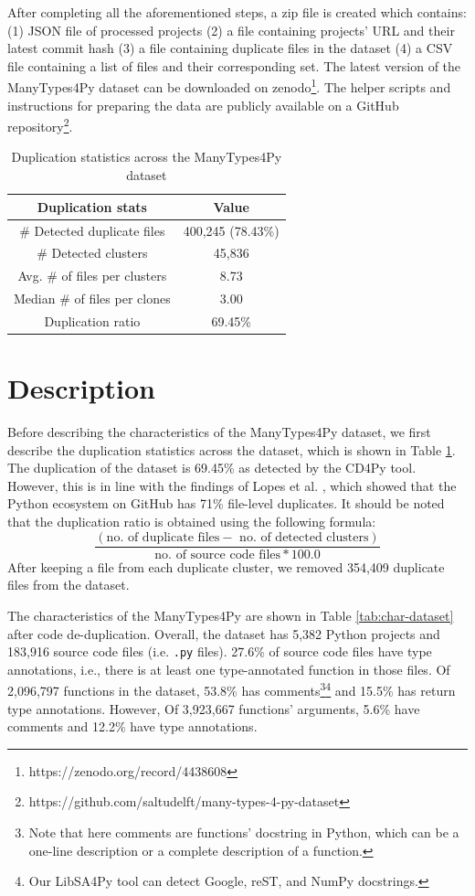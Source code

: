 \documentclass[10pt, conference]{IEEEtran}
\begin{document}
After completing all the aforementioned steps, a zip file is created which contains: (1) JSON file of processed projects (2) a file containing projects' URL and their latest commit hash (3) a file containing duplicate files in the dataset (4) a CSV file containing a list of files and their corresponding set. The latest version of the ManyTypes4Py dataset can be downloaded on zenodo\footnote{https://zenodo.org/record/4438608}. The helper scripts and instructions for preparing the data are publicly available on a GitHub repository\footnote{https://github.com/saltudelft/many-types-4-py-dataset}.

\begin{table}[!t]
	\centering
	\label{tab:dup-stats}
	\caption{Duplication statistics across the ManyTypes4Py dataset}
	\begin{tabular}{c c}
		\toprule
		Duplication stats & Value \\
		\midrule
		\# Detected duplicate files & 400,245 (78.43\%) \\
		\# Detected clusters & 45,836 \\
		Avg. \# of files per clusters & 8.73 \\
		Median \# of files per clones & 3.00 \\
		Duplication ratio & 69.45\% \\
		\bottomrule
	\end{tabular}
\end{table}

\section{Description}
Before describing the characteristics of the ManyTypes4Py dataset, we first describe the duplication statistics across the dataset, which is shown in Table \ref{tab:dup-stats}. The duplication of the dataset is 69.45\% as detected by the CD4Py tool. However, this is in line with the findings of Lopes et al. \cite{lopes2017dejavu}, which showed that the Python ecosystem on GitHub has 71\% file-level duplicates. It should be noted that the duplication ratio is obtained using the following formula:
\begin{equation}
\frac{(\text{no. of duplicate files} -\text{ no. of detected clusters})}{\text{no. of source code files} * 100.0}
\end{equation}
After keeping a file from each duplicate cluster, we removed 354,409 duplicate files from the dataset.

The characteristics of the ManyTypes4Py are shown in Table \ref{tab:char-dataset} after code de-duplication. Overall, the dataset has 5,382 Python projects and 183,916 source code files (i.e. \texttt{.py} files). 27.6\% of source code files have type annotations, i.e., there is at least one type-annotated function in those files. Of 2,096,797 functions in the dataset, 53.8\% has comments\footnote{Note that here comments are functions' docstring in Python, which can be a one-line description or a complete description of a function.}\footnote{Our LibSA4Py tool can detect Google, reST, and NumPy docstrings.} and 15.5\% has return type annotations. However, Of 3,923,667 functions' arguments, 5.6\% have comments and 12.2\% have type annotations.
\end{document}
